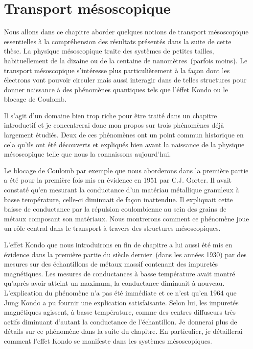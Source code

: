 


\chapter{Transport mésoscopique}

Nous allons dans ce chapitre aborder quelques notions de transport mésoscopique essentielles à la compréhension des résultats présentés dans la suite de cette thèse. La physique mésoscopique traite des systèmes de petites tailles, habituellement de la dizaine ou de la centaine de nanomètres~(parfois moins). Le transport mésoscopique s'intéresse plus particulièrement à la façon dont les électrons vont pouvoir circuler mais aussi interagir dans de telles structures pour donner naissance à des phénomènes quantiques tels que l'éffet Kondo ou le blocage de Coulomb. 

Il s'agit d'un domaine bien trop riche pour être traité dans un chapitre introductif et je concentrerai donc mon propos sur trois phénomènes déjà largement étudiés. Deux de ces phénomènes ont un point commun historique en cela qu'ils ont été découverts et expliqués bien avant la naissance de la physique mésoscopique telle que nous la connaissons aujourd'hui.

Le blocage de Coulomb par exemple que nous aborderons dans la première partie a été pour la première fois mis en évidence en 1951 par C.J. Gorter. Il avait constaté qu'en mesurant la conductance d'un matériau métallique granuleux à basse température, celle-ci diminuait de façon inattendue. Il expliquait cette baisse de conductance par la répulsion coulombienne au sein des grains de métaux composant son matériaux. Nous montrerons comment ce phénomène joue un rôle central dans le transport à travers des structures mésoscopiques.

L'effet Kondo que nous introduirons en fin de chapitre a lui aussi été mis en évidence dans la première partie du siècle dernier~(dans les années 1930) par des mesures sur des échantillons de métaux massif contenant des impuretés magnétiques. Les mesures de conductances à basse température avait montré qu'après avoir atteint un maximum, la conductance diminuait à nouveau. L'explication du phénomène n'a pas été immédiate et ce n'est qu'en 1964 que Jung Kondo a pu fournir une explication satisfaisante. Selon lui, les impuretés magnétiques agissent, à basse température, comme des centres diffuseurs très actifs diminuant d'autant la conductance de l'échantillon. Je donnerai plus de détails sur ce phénomène dans la suite du chapitre. En particulier, je détaillerai comment l'effet Kondo se manifeste dans les systèmes mésoscopiques.

